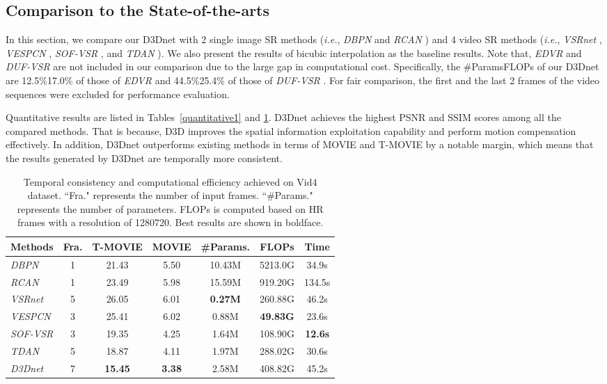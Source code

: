 \documentclass[journal]{IEEEtran}
\begin{document}
\subsection{Comparison to the State-of-the-arts}

In this section, we compare our D3Dnet with 2 single image SR methods (\textit{i.e.}, \textit{DBPN} \cite{DBPN} and \textit{RCAN} \cite{RCAN}) and 4 video SR methods (\textit{i.e.}, \textit{VSRnet} \cite{VSRnet}, \textit{VESPCN} \cite{VESPCN},  \textit{SOF-VSR} \cite{SOFVSR20, SOFVSR18}, and \textit{TDAN} \cite{TDAN}). We also present the results of bicubic interpolation as the baseline results. Note that, \textit{EDVR} \cite{EDVR} and \textit{DUF-VSR} \cite{DUF-VSR} are  not included in our comparison due to the large gap in computational cost. Specifically, the \#ParamsFLOPs of our D3Dnet are 12.5\%17.0\% of those of \textit{EDVR} \cite{EDVR} and 44.5\%25.4\% of those of \textit{DUF-VSR}  \cite{DUF-VSR}. For fair comparison, the first and the last 2 frames of the video sequences were excluded for performance evaluation.

Quantitative results are listed in Tables~\ref{quantitative1} and \ref{quantitative2}. D3Dnet achieves the highest PSNR and SSIM scores among all the compared methods. That is because, D3D improves the spatial information exploitation capability and perform motion compensation effectively. In addition, D3Dnet outperforms existing methods in terms of MOVIE and T-MOVIE by a notable margin, which means that the results generated by D3Dnet are temporally more consistent.

\begin{table}
\footnotesize
\centering
\renewcommand\arraystretch{1.2}
\caption{Temporal consistency and computational efficiency achieved on Vid4 \cite{VESPCN} dataset. ``Fra." represents the number of input frames. ``\#Params." represents the number of parameters. FLOPs is computed based on HR frames with a resolution of 1280720.
Best results are shown in boldface.}\label{quantitative2}
\scriptsize
\begin{tabular}{|p{1.3cm}|c|c|c|c|c|c|}
\hline
Methods&Fra.&T-MOVIE&MOVIE&\#Params.&FLOPs&Time\\
\hline
\textit{DBPN} \cite{DBPN}&1&21.43&5.50&10.43M&5213.0G&34.9s\\
\textit{RCAN} \cite{RCAN}&1&23.49&5.98&15.59M&919.20G&134.5s\\
\textit{VSRnet} \cite{VSRnet}&5&26.05&6.01&\textbf{0.27M}&260.88G&46.2s\\
\textit{VESPCN} \cite{VESPCN}&3&25.41&6.02&0.88M&\textbf{49.83G}&23.6s\\
\textit{SOF-VSR} \cite{SOFVSR20}&3&19.35&4.25&1.64M&108.90G&\textbf{12.6s}\\
\textit{TDAN} \cite{TDAN}&5&18.87&4.11&1.97M&288.02G&30.6s\\
\textit{D3Dnet}&7&\textbf{15.45}&\textbf{3.38}&2.58M&408.82G&45.2s\\
\hline
\end{tabular}
\end{table}
\end{document}
